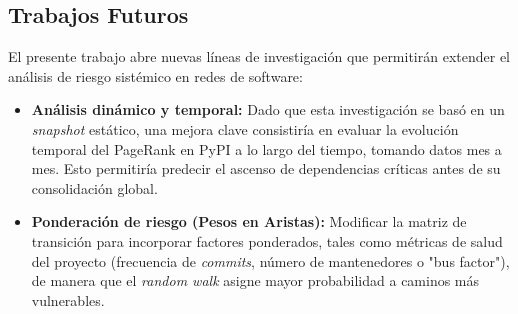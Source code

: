 \subsection{Trabajos Futuros}
El presente trabajo abre nuevas líneas de investigación que permitirán extender el análisis de riesgo sistémico en redes de software:

\begin{itemize}
    \item \textbf{Análisis dinámico y temporal:} Dado que esta investigación se basó en un \textit{snapshot} estático, una mejora clave consistiría en evaluar la evolución temporal del PageRank en PyPI a lo largo del tiempo, tomando datos mes a mes. Esto permitiría predecir el ascenso de dependencias críticas antes de su consolidación global.
    \item \textbf{Ponderación de riesgo (Pesos en Aristas):} Modificar la matriz de transición para incorporar factores ponderados, tales como métricas de salud del proyecto (frecuencia de \textit{commits}, número de mantenedores o "bus factor"), de manera que el \textit{random walk} asigne mayor probabilidad a caminos más vulnerables.
\end{itemize}
